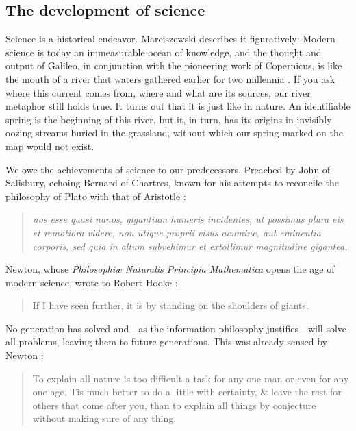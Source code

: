 \documentclass[pdftex,12pt]{article}
\begin{document}
\subsection{The development of science} 

Science is a historical endeavor. Marciszewski  describes it figuratively: Modern science is today an immeasurable ocean of knowledge, and the thought and output of Galileo, in conjunction with the pioneering work of Copernicus, is like the mouth of a river that  waters gathered earlier for two millennia \parencite[p.232]{MarciszewskiStacewicz2011}. If you ask where this current comes from, where and what are its sources, our river metaphor still holds true. It turns out that it is just like in nature. An identifiable spring is the beginning of this river, but it, in turn, has its origins in invisibly oozing streams buried in the grassland, without which our spring marked on the map would not exist.

We owe the achievements of science to our predecessors. Preached by John of Salisbury, echoing Bernard of Chartres, known for his attempts to reconcile the philosophy of Plato with that of Aristotle \parencites{Fairweather1956}[III. CAP IV]{Saresberiensis1159}{Saresberiensis1955}: \begin{quote} \small \emph{nos esse quasi nanos, gigantium humeris incidentes, ut possimus plura eis et remotiora videre, non utique proprii visus acumine, aut eminentia corporis, sed quia in altum subvehimur et extollimur magnitudine gigantea.} \end{quote}
Newton, whose \emph{Philosophi{\ae} Naturalis Principia Mathematica} \parencite*{Newton1687} opens the age of modern science, wrote to Robert Hooke \parencite*{Newton1675}: \begin{quote} \small If I have seen further, it is by standing on the shoulders of giants. \end{quote}


No generation has solved and---as the information philosophy justifies---will solve all problems, leaving them to future generations. This was already sensed by Newton \parencite[p.643] {Westfall1983}: \begin{quote} \small To explain all nature is too difficult a task for any one man or even for any one age. Tis much better to do a little with certainty, \& leave the rest for others that come after you, than to explain all things by conjecture without making sure of any thing. \end{quote}
\end{document}
